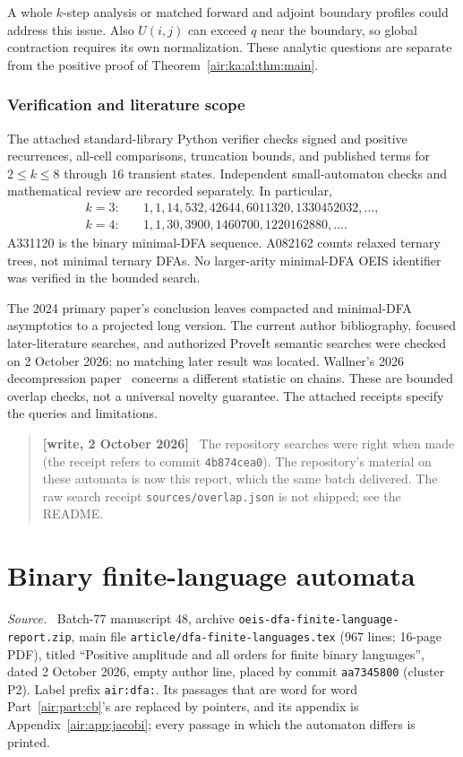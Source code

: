 \documentclass[11pt,letterpaper]{article}
\numberwithin{equation}{section}
\theoremstyle{remark}
\newenvironment{writenote}{\par\smallskip\begin{quote}\small\textbf{[write, 2 October 2026]}\ }{\end{quote}\smallskip}
\newenvironment{partsource}{\par\medskip\noindent\begin{minipage}{\linewidth}\small\raggedright\textit{Source.}\ }{\end{minipage}\par\medskip}
\newcommand{\repopath}[1]{\nolinkurl{#1}}
\begin{document}
A whole $k$-step analysis or matched forward and adjoint boundary profiles
could address this issue. Also $U(i,j)$ can exceed $q$ near the boundary,
so global contraction requires its own normalization. These analytic
questions are separate from the positive proof of Theorem~\ref{air:ka:al:thm:main}.

\section{Verification and literature scope}\label{air:ka:al:sec:verification}
The attached standard-library Python verifier checks signed and positive
recurrences, all-cell comparisons, truncation bounds, and published terms
for $2\le k\le8$ through $16$ transient states. Independent small-automaton
checks and mathematical review are recorded separately. In particular,
\[
\begin{aligned}
k=3:&\quad 1,1,14,532,42644,6011320,1330452032,\ldots,\\
k=4:&\quad 1,1,30,3900,1460700,1220162880,\ldots.
\end{aligned}
\]
A331120 is the binary minimal-DFA sequence. A082162 counts relaxed ternary
trees, not minimal ternary DFAs. No larger-arity minimal-DFA OEIS identifier
was verified in the bounded search.

The 2024 primary paper's conclusion leaves compacted and minimal-DFA
asymptotics to a projected long version. The current author bibliography,
focused later-literature searches, and authorized ProveIt semantic searches
were checked on 2 October 2026; no matching later result was located.
Wallner's 2026 decompression paper~\cite{decomp} concerns a different statistic
on chains. These are bounded overlap checks, not a universal novelty guarantee.
The attached receipts specify the queries and limitations.
\begin{writenote}
The repository searches were right when made (the receipt refers to commit \texttt{4b874cea0}). The repository's material on these automata is now this report, which the same batch delivered. The raw search receipt \repopath{sources/overlap.json} is not shipped; see the README.
\end{writenote}


\part{Binary finite-language automata}\label{air:part:dfa}

\begin{partsource}
Batch-77 manuscript 48, archive \repopath{oeis-dfa-finite-language-report.zip}, main file \repopath{article/dfa-finite-languages.tex} (967 lines; 16-page PDF), titled ``Positive amplitude and all orders for finite binary languages'', dated 2 October 2026, empty author line, placed by commit \texttt{aa7345800} (cluster P2). Label prefix \texttt{air:dfa:}. Its passages that are word for word Part~\ref{air:part:cb}'s are replaced by pointers, and its appendix is Appendix~\ref{air:app:jacobi}; every passage in which the automaton differs is printed.
\end{partsource}
\end{document}
